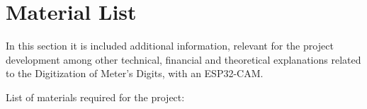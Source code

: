 %
%


\chapter{Material List}

In this section it is included additional information, relevant for the project development among other technical, financial and theoretical explanations related to the Digitization of Meter's Digits, with an ESP32-CAM.


\bigskip



List of materials required for the project:

